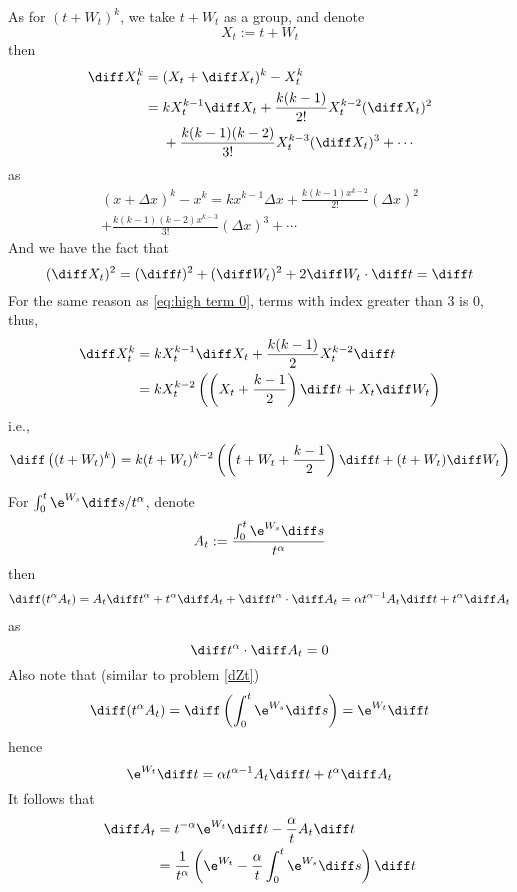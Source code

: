     As for $(t+W_t)^k$, we take $t+W_t$ as a group, and denote
    \[X_t:=t+W_t\]
    then
    \[\begin{aligned}
        \diff X_t^k&=(X_t+\diff X_t)^k-X_t^k\\
        &=\begin{aligned}[t]
        &kX_t^{k-1}\diff X_t+\frac{k(k-1)}{2!}X_t^{k-2}(\diff X_t)^2\\
        &+\frac{k(k-1)(k-2)}{3!}X_t^{k-3}(\diff X_t)^3+\cdots
        \end{aligned}
    \end{aligned}\]
    as
    \begin{multline*}
        (x+\Delta x)^k-x^k=kx^{k-1}\Delta x
        +\frac{k(k-1)x^{k-2}}{2!}(\Delta x)^2\\
        +\frac{k(k-1)(k-2)x^{k-3}}{3!}(\Delta x)^3+\cdots
    \end{multline*}
    And we have the fact that
    \[(\diff X_t)^2=(\diff t)^2+(\diff W_t)^2+2\diff W_t\cdot\diff t
    =\diff t\]
    For the same reason as \cref{eq:high term 0}, terms with index
    greater than 3 is 0, thus,
    \[\begin{aligned}
        \diff X_t^k&=kX_t^{k-1}\diff X_t+\frac{k(k-1)}{2}X_t^{k-2}\diff t\\
        &=kX_t^{k-2}\left(\left(X_t+\frac{k-1}{2}\right)\diff t+X_t\diff W_t\right)
    \end{aligned}\]
    i.e.,
    \[\diff \left((t+W_t)^k\right)=
    k(t+W_t)^{k-2}
    \left(\left(t+W_t+\frac{k-1}{2}\right)\diff t
    +(t+W_t)\diff W_t\right)
    \]

    For $\int_0^t\e^{W_s}\diff s/t^\alpha$, denote
    \[A_t:=\frac{\int_0^t\e^{W_s}\diff s}{t^\alpha}\]
    then
    \[\begin{aligned}
        \diff(t^\alpha A_t)=A_t\diff t^\alpha+t^\alpha\diff A_t
        +\diff t^\alpha\cdot\diff A_t
        =\alpha t^{\alpha-1}A_t\diff t+t^\alpha\diff A_t
    \end{aligned}\]
    as
    \[\diff t^\alpha\cdot\diff A_t=0\]
    Also note that (similar to problem \ref{dZt})
    \[\diff (t^\alpha A_t)=\diff\left(\int_0^t\e^{W_s}\diff s\right)
    =\e^{W_t}\diff t\]
    hence
    \[\e^{W_t}\diff t=\alpha t^{\alpha-1}A_t\diff t+t^\alpha\diff A_t\]
    It follows that
    \[\begin{aligned}
        \diff A_t&=t^{-\alpha}\e^{W_t}\diff t-\frac{\alpha}{t}A_t\diff t\\
        &=\frac{1}{t^\alpha}\left(
            \e^{W_t}-\frac{\alpha}{t}\int_0^t\e^{W_s}\diff s
        \right)\diff t
    \end{aligned}\]

